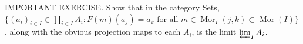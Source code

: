 IMPORTANT EXERCISE. Show that in the category Sets, $\{(a_i)_{i\in I}\in\prod_{i\in I} A_i : F(m)(a_j)=a_k\text{ for all }m\in\operatorname{Mor}_I(j,k)\subset\operatorname{Mor}(I)\}$, along with the obvious projection maps to each $A_i$, is the limit $\varprojlim_I A_i$.
